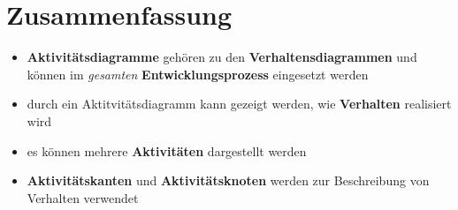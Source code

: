 \section{Zusammenfassung}

\begin{itemize}
    \item \textbf{Aktivitätsdiagramme} gehören zu den \textbf{Verhaltensdiagrammen} und können im \textit{gesamten} \textbf{Entwicklungsprozess} eingesetzt werden
    \item durch ein Aktitvitätsdiagramm kann gezeigt werden, wie \textbf{Verhalten} realisiert wird
    \item es können mehrere \textbf{Aktivitäten} dargestellt werden
    \item \textbf{Aktivitätskanten} und \textbf{Aktivitätsknoten} werden zur Beschreibung von Verhalten verwendet
\end{itemize}